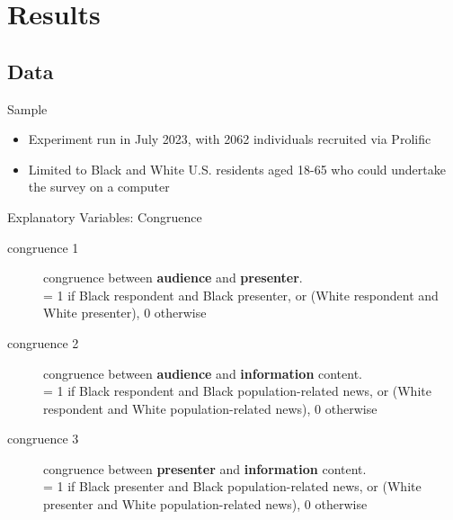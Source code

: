 \documentclass[10pt]{beamer}
\begin{document}
\section{Results}
\subsection{Data}
\begin{frame}{Sample}
\label{data}
\begin{itemize}
    \item Experiment run in July 2023, with 2062 individuals recruited via Prolific
    \item Limited to Black and White U.S. residents aged 18-65 who could undertake the survey on a computer
\end{itemize}
\hfill \hyperlink{balance}{}
\end{frame}



\begin{frame}{Explanatory Variables: Congruence}

      \begin{description}
\item[congruence 1] congruence between \textbf{audience} and \textbf{presenter}. \\
    = 1 if Black respondent and Black presenter, or (White respondent and White presenter), 0 otherwise 
 \item[congruence 2] congruence between \textbf{audience} and \textbf{information} content. \\
    = 1 if Black respondent and Black population-related news, or (White respondent and White population-related news), 0 otherwise
 \item[congruence 3] congruence between \textbf{presenter} and \textbf{information} content. \\
    = 1 if Black presenter and Black population-related news, or (White presenter and White population-related news), 0 otherwise 
      \end{description}
\end{frame}
\end{document}
